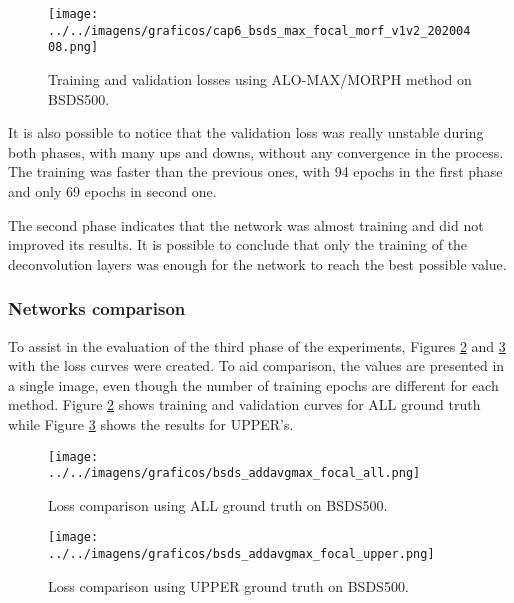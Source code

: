 \begin{figure}%
  \centering
  \caption{Training and validation losses using ALO-MAX/MORPH method on BSDS500.}
  \texttt{[image: ../../imagens/graficos/cap6\_bsds\_max\_focal\_morf\_v1v2\_20200408.png]}
  \sourceOwn
  \label{fig:bsds_max_focal_morf_v1v2}
\end{figure}

It is also possible to notice that the validation loss was really unstable during both phases, with many ups and downs, without any convergence in the process.
The training was faster than the previous ones, with 94 epochs in the first phase and only 69 epochs in second one.

The second phase indicates that the network was almost training and did not improved its results.
It is possible to conclude that only the training of the deconvolution layers was enough for the network to reach the best possible value.

\subsubsection{Networks comparison}
\label{ssec:bsds_subexp1_comparison}

To assist in the evaluation of the third phase of the experiments, Figures \ref{fig:bsds_addavgmax_focal_all} and \ref{fig:bsds_addavgmax_focal_upper} with the loss curves were created.
To aid comparison, the values are presented in a single image, even though the number of training epochs are different for each method.
Figure \ref{fig:bsds_addavgmax_focal_all} shows training and validation curves for ALL ground truth while Figure \ref{fig:bsds_addavgmax_focal_upper} shows the results for UPPER's.

\begin{figure}%
  \centering
  \caption{Loss comparison using ALL ground truth on BSDS500.}
  \texttt{[image: ../../imagens/graficos/bsds\_addavgmax\_focal\_all.png]}
  \sourceOwn
  \label{fig:bsds_addavgmax_focal_all}
\end{figure}

\begin{figure}%
  \centering
  \caption{Loss comparison using UPPER ground truth on BSDS500.}
  \texttt{[image: ../../imagens/graficos/bsds\_addavgmax\_focal\_upper.png]}
  \sourceOwn
  \label{fig:bsds_addavgmax_focal_upper}
\end{figure}

